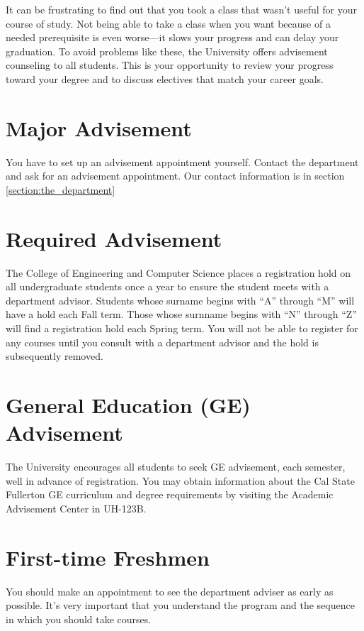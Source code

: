 \documentclass{book}
\begin{document}
It can be frustrating to find out that you took a class that wasn't useful for your course of study. Not being able to take a class when you want because of a needed prerequisite is even worse---it slows your progress and can delay your graduation. To avoid problems like these, the University offers advisement counseling to all students. This is your opportunity to review your progress toward your degree and to discuss electives that match your career goals.

\section{Major Advisement}
You have to set up an advisement appointment yourself. Contact the department and ask for an advisement appointment. Our contact information is in section \ref{section:the_department}

\section{Required Advisement}
The College of Engineering and Computer Science places a registration hold on all undergraduate students once a year to ensure the student meets with a department advisor. Students whose surname begins with ``A'' through ``M'' will have a hold each Fall term. Those whose surnname begins with ``N'' through ``Z'' will find a registration hold each Spring term.  You will not be able to register for any courses until you consult with a department advisor and the hold is subsequently removed.

\section{General Education (GE) Advisement}
 
The University encourages all students to seek GE advisement, each semester, well in advance of registration.  You may obtain information about the Cal State Fullerton GE curriculum and degree requirements by visiting the Academic Advisement Center in UH-123B.

\section{First-time Freshmen}
You should make an appointment to see the department adviser as early as possible. It's very important that you understand the program and the sequence in which you should take courses.
\end{document}

